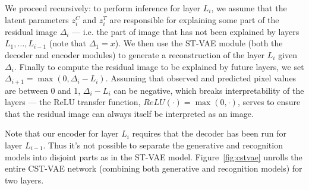 We proceed recursively: to perform inference for  layer $L_i$, we assume that the latent parameters $z^C_i$ and $z^T_i$ are responsible for explaining
some part of the residual image $\Delta_i$ --- i.e. the part of image that has not been explained by layers $L_1, \dots, L_{i-1}$ (note that $\Delta_1=x$).
We then use the ST-VAE module (both the decoder and encoder modules) 
to generate a reconstruction of the layer $L_i$ given $\Delta_i$.  Finally to compute the residual image to be explained by future layers, we set
$\Delta_{i+1} = \max (0, \Delta_i - L_i)$.  Assuming that observed and predicted pixel values are between 0 and 1, $\Delta_i-L_i$ can be negative, which breaks interpretability of the layers --- the ReLU transfer function, $ReLU(\cdot)=\max(0, \cdot)$, serves to ensure that the residual image can always itself be interpreted as an image.

Note that our encoder for layer $L_i$ requires that the decoder has been run for layer $L_{i-1}$.  Thus it's not possible to separate the generative
and recognition models into disjoint parts as in the ST-VAE model.  Figure~\ref{fig:cstvae} unrolls the entire CST-VAE network (combining
both generative and recognition models) for two layers.












